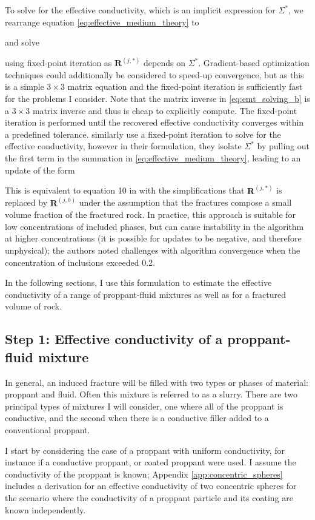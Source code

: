 To solve for the effective conductivity, which is an implicit expression for $\Sigma^*$, we rearrange equation \ref{eq:effective_medium_theory} to

and solve

using fixed-point iteration as $\mathbf{R}^{(j, *)}$ depends on $\Sigma^*$. Gradient-based optimization techniques could additionally be considered to speed-up convergence, but as this is a simple $3\times3$ matrix equation and the fixed-point iteration is sufficiently fast for the problems I consider. Note that the matrix inverse in \ref{eq:emt_solving_b} is a $3\times 3$ matrix inverse and thus is cheap to explicitly compute. The fixed-point iteration is performed until the recovered effective conductivity converges within a predefined tolerance. \cite{Berryman2013} similarly use a fixed-point iteration to solve for the effective conductivity, however in their formulation, they isolate $\Sigma^*$ by pulling out the first term in the summation in \ref{eq:effective_medium_theory}, leading to an update of the form

This is equivalent to equation 10 in \cite{Berryman2013} with the simplifications that $\mathbf{R}^{(j, *)}$ is replaced by $\mathbf{R}^{(j, 0)}$ under the assumption that the fractures compose a small volume fraction of the fractured rock. In practice, this approach is suitable for low concentrations of included phases, but can cause instability in the algorithm at higher concentrations (it is possible for updates to be negative, and therefore unphysical); the authors noted challenges with algorithm convergence when the concentration of inclusions exceeded 0.2.

In the following sections, I use this formulation to estimate the effective conductivity of a range of proppant-fluid mixtures as well as for a fractured volume of rock.

\subsection{Step 1: Effective conductivity of a proppant-fluid mixture}
In general, an induced fracture will be filled with two types or phases of material: proppant and fluid. Often this mixture is referred to as a slurry. There are two principal types of mixtures I will consider, one where all of the proppant is conductive, and the second when there is a conductive filler added to a conventional proppant.

I start by considering the case of a proppant with uniform conductivity, for instance if a conductive proppant, or coated proppant were used. I assume the conductivity of the proppant is known; Appendix \ref{app:concentric_spheres} includes a derivation for an effective conductivity of two concentric spheres for the scenario where the conductivity of a proppant particle and its coating are known independently.

